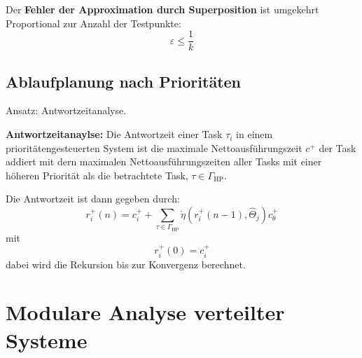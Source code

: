 \begin{tcolorbox}
    Der \textbf{Fehler der Approximation durch Superposition} ist umgekehrt
    Proportional zur Anzahl der Testpunkte:
    \begin{equation}
        \varepsilon \leq \frac{1}{k}
    \end{equation}
\end{tcolorbox}

\subsection{Ablaufplanung nach Prioritäten}
Ansatz: Antwortzeitanalyse.

\begin{tcolorbox}
    \textbf{Antwortzeitanaylse:} Die Antwortzeit einer Task $\tau_i$ in einem
    prioritätengesteuerten System ist die maximale Nettoausführungszeit $c^+$
    der Task addiert mit dern maximalen Nettoausführungszeiten aller Tasks mit einer
    höheren Priorität als die betrachtete Task, $\tau \in \Gamma_\text{HP}$.

    Die Antwortzeit ist dann gegeben durch:
    \begin{equation}
        r_i^+(n) = c_i^+ + \sum_{\tau \in \Gamma_\text{HP}} \check{\eta}(
            r_i^+(n-1), \hat{\Theta}_j) c_\theta^+
    \end{equation}
    mit
    \begin{equation}
        r^+_i(0) = c_i^+
    \end{equation}
    dabei wird die Rekursion bis zur Konvergenz berechnet.
\end{tcolorbox}

\section{Modulare Analyse verteilter Systeme}

